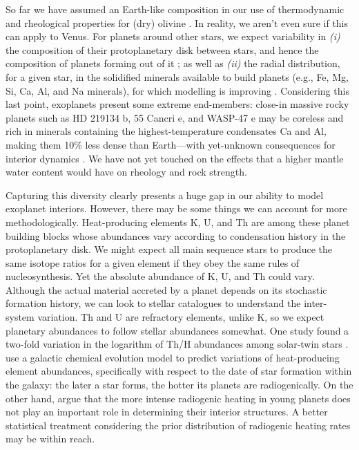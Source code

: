 So far we have assumed an Earth-like composition in our use of thermodynamic and rheological properties for (dry) olivine \citep{Karato1993}. In reality, we aren't even sure if this can apply to Venus. For planets around other stars, we expect variability in \textit{(i)} the composition of their protoplanetary disk between stars, and hence the composition of planets forming out of it \citep{Bitsch2020}; as well as \textit{(ii)} the radial distribution, for a given star, in the solidified minerals available to build planets (e.g., Fe, Mg, Si, Ca, Al, and Na minerals), for which modelling is improving \citep{Miyazaki2020}. Considering this last point, exoplanets present some extreme end-members: close-in massive rocky planets such as HD 219134 b, 55 Cancri e, and WASP-47 e may be coreless and rich in minerals containing the highest-temperature condensates Ca and Al, making them 10\% less dense than Earth---with yet-unknown consequences for interior dynamics \citep{Dorn2019}. %
We have not yet touched on the effects that a higher mantle water content would have on rheology and rock strength.

Capturing this diversity clearly presents a huge gap in our ability to model exoplanet interiors. However, there may be some things we can account for more methodologically. Heat-producing elements K, U, and Th are among these planet building blocks whose abundances vary according to condensation history in the protoplanetary disk. We might expect all main sequence stars to produce the same isotope ratios for a given element if they obey the same rules of nucleosynthesis. Yet the absolute abundance of K, U, and Th could vary. Although the actual material accreted by a planet depends on its stochastic formation history, we can look to stellar catalogues to understand the inter-system variation. Th and U are refractory elements, unlike K, so we expect planetary abundances to follow stellar abundances somewhat. One study found a two-fold variation in the logarithm of Th/H abundances among solar-twin stars \citep{Unterborn2015}. \citet{Frank2014} use a galactic chemical evolution model to predict variations of heat-producing element abundances, specifically with respect to the date of star formation within the galaxy: the later a star forms, the hotter its planets are radiogenically. On the other hand, \citet{Wagner2012} argue that the more intense radiogenic heating in young planets does not play an important role in determining their interior structures. A better statistical treatment considering the prior distribution of radiogenic heating rates may be within reach.


